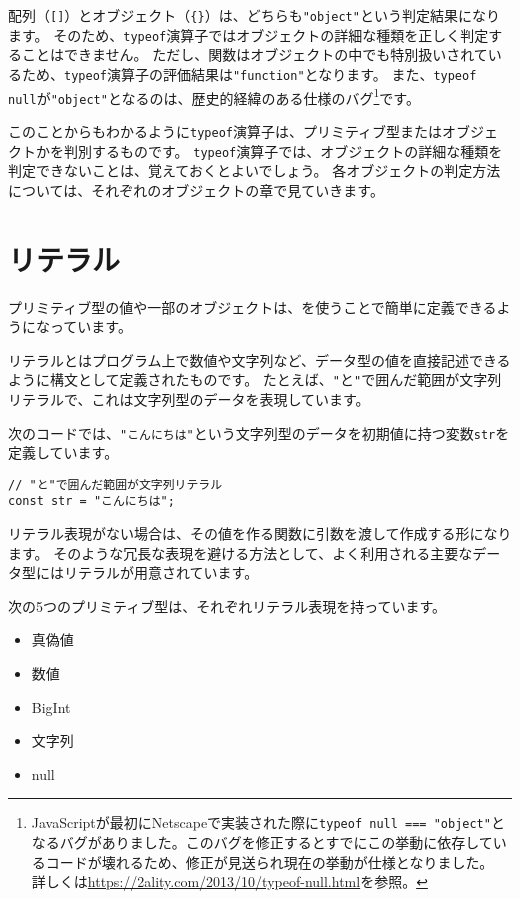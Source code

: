配列（\texttt{[]}）とオブジェクト（\texttt{\{\}}）は、どちらも\texttt{"object"}という判定結果になります。
そのため、\texttt{typeof}演算子ではオブジェクトの詳細な種類を正しく判定することはできません。
ただし、関数はオブジェクトの中でも特別扱いされているため、\texttt{typeof}演算子の評価結果は\texttt{"function"}となります。
また、\texttt{typeof null}が\texttt{"object"}となるのは、歴史的経緯のある仕様のバグ\footnote{JavaScriptが最初にNetscapeで実装された際に\texttt{typeof null === "object"}となるバグがありました。このバグを修正するとすでにこの挙動に依存しているコードが壊れるため、修正が見送られ現在の挙動が仕様となりました。 詳しくは\url{https://2ality.com/2013/10/typeof-null.html}を参照。}です。

このことからもわかるように\texttt{typeof}演算子は、プリミティブ型またはオブジェクトかを判別するものです。
\texttt{typeof}演算子では、オブジェクトの詳細な種類を判定できないことは、覚えておくとよいでしょう。
各オブジェクトの判定方法については、それぞれのオブジェクトの章で見ていきます。

\hypertarget{literal}{%
\section{リテラル}\label{literal}}

プリミティブ型の値や一部のオブジェクトは、\textbf{}を使うことで簡単に定義できるようになっています。

リテラルとはプログラム上で数値や文字列など、データ型の値を直接記述できるように構文として定義されたものです。
たとえば、\texttt{"}と\texttt{"}で囲んだ範囲が文字列リテラルで、これは文字列型のデータを表現しています。

次のコードでは、\texttt{"こんにちは"}という文字列型のデータを初期値に持つ変数\texttt{str}を定義しています。

\begin{lstlisting}
// "と"で囲んだ範囲が文字列リテラル
const str = "こんにちは";
\end{lstlisting}

リテラル表現がない場合は、その値を作る関数に引数を渡して作成する形になります。
そのような冗長な表現を避ける方法として、よく利用される主要なデータ型にはリテラルが用意されています。

次の5つのプリミティブ型は、それぞれリテラル表現を持っています。
\newpage
\begin{itemize}
\item
  真偽値
\item
  数値
\item
  BigInt
\item
  文字列
\item
  null
\end{itemize}


